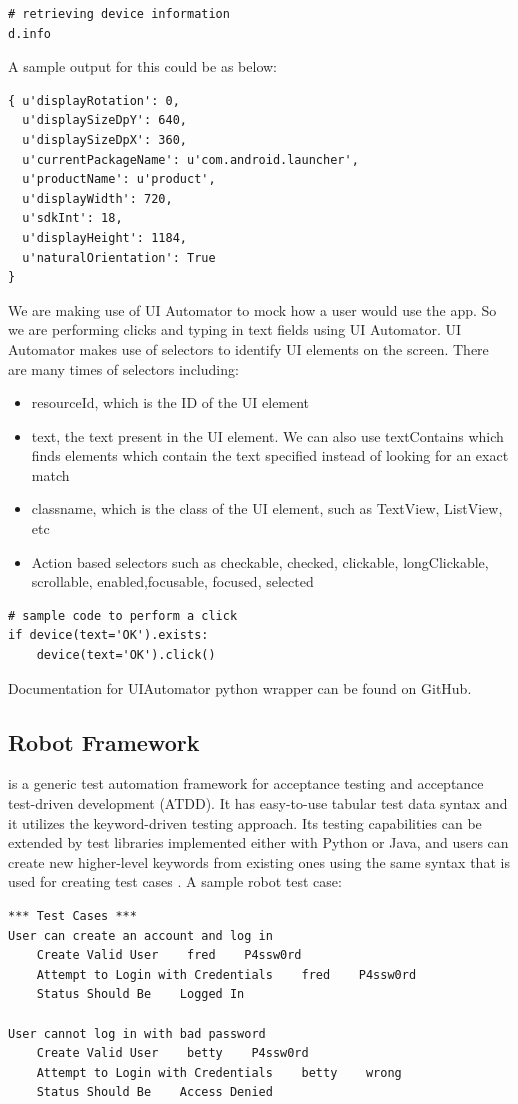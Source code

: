 \begin{lstlisting}[style=PyStyle]
# retrieving device information
d.info 
\end{lstlisting}

A sample output for this could be as below:
\begin{lstlisting}[style=PyStyle]
{ u'displayRotation': 0,
  u'displaySizeDpY': 640,
  u'displaySizeDpX': 360,
  u'currentPackageName': u'com.android.launcher',
  u'productName': u'product',
  u'displayWidth': 720,
  u'sdkInt': 18,
  u'displayHeight': 1184,
  u'naturalOrientation': True
}
\end{lstlisting}

We are making use of UI Automator to mock how a user would use the app. So we are performing clicks and typing in text fields using UI Automator. UI Automator makes use of selectors to identify UI elements on the screen. There are many times of selectors including:
\begin{itemize}
	\item resourceId, which is the ID of the UI element
	\item text, the text present in the UI element. We can also use textContains which finds elements which contain the text specified instead of looking for an exact match
	\item classname, which is the class of the UI element, such as TextView, ListView, etc
	\item Action based selectors such as checkable, checked, clickable, longClickable, scrollable, enabled,focusable, focused, selected
\end{itemize}
\begin{lstlisting}[style=PyStyle]
# sample code to perform a click
if device(text='OK').exists:
    device(text='OK').click()
\end{lstlisting}
Documentation for UIAutomator python wrapper can be found on GitHub. \cite{uiautomatordoc}\\

\subsection{Robot Framework} is a generic test automation framework for acceptance testing and acceptance test-driven development (ATDD). It has easy-to-use tabular test data syntax and it utilizes the keyword-driven testing approach. Its testing capabilities can be extended by test libraries implemented either with Python or Java, and users can create new higher-level keywords from existing ones using the same syntax that is used for creating test cases \cite{robot}.
A sample robot test case:
\begin{lstlisting}[style=PyStyle]
*** Test Cases ***
User can create an account and log in
    Create Valid User    fred    P4ssw0rd
    Attempt to Login with Credentials    fred    P4ssw0rd
    Status Should Be    Logged In

User cannot log in with bad password
    Create Valid User    betty    P4ssw0rd
    Attempt to Login with Credentials    betty    wrong
    Status Should Be    Access Denied
\end{lstlisting}

